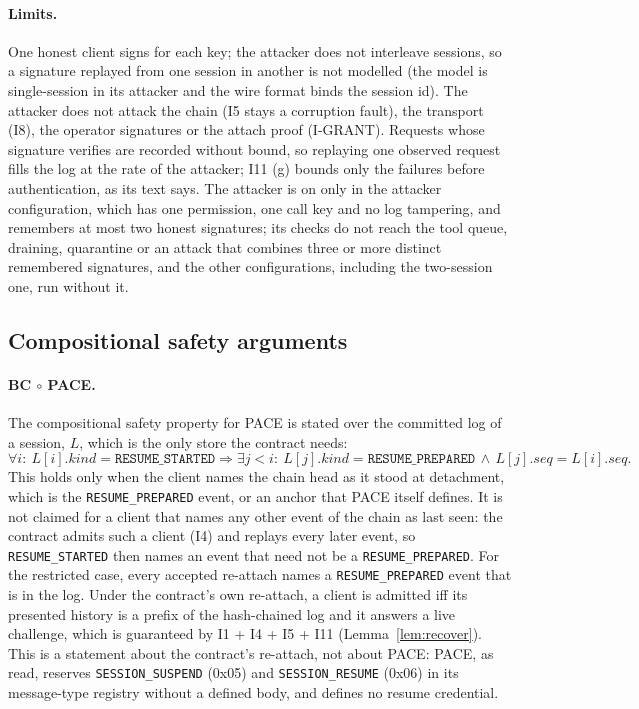 \paragraph{Limits.} One honest client signs for each key; the attacker
does not interleave sessions, so a signature replayed from one session in
another is not modelled (the model is single-session in its attacker and the
wire format binds the session id). The attacker does not attack the chain
(I5 stays a corruption fault), the transport (I8), the operator signatures
or the attach proof (I-GRANT). Requests whose signature verifies are
recorded without bound, so replaying one observed request fills the log at
the rate of the attacker; I11 (g) bounds only the failures before
authentication, as its text says. The attacker is on only in the attacker
configuration, which has one permission, one call key and no log tampering,
and remembers at most two honest signatures; its checks do not reach the
tool queue, draining, quarantine or an attack that combines three or more
distinct remembered signatures, and the other configurations, including the
two-session one, run without it.

\subsection{Compositional safety arguments}
\label{app:comp-safety}

\paragraph{BC $\circ$ PACE.}
The compositional safety property for PACE is stated over the committed
log of a session, $L$, which is the only store the contract needs:
\[
\forall i:\ L[i].\textit{kind} = \texttt{RESUME\_STARTED}
\Rightarrow
\exists j < i:\ L[j].\textit{kind} = \texttt{RESUME\_PREPARED}
\,\wedge\, L[j].\textit{seq} = L[i].\textit{seq}.
\]
This holds only when the client names the chain head as it stood at
detachment, which is the \texttt{RESUME\_PREPARED} event, or an anchor
that PACE itself defines. It is not claimed for a client that names any
other event of the chain as last seen: the contract admits such a client
(I4) and replays every later event, so \texttt{RESUME\_STARTED}
then names an event that need not be a \texttt{RESUME\_PREPARED}. For the
restricted case, every accepted re-attach names a
\texttt{RESUME\_PREPARED} event that is in the log. Under the contract's own re-attach, a
client is admitted iff its presented history is a prefix of the
hash-chained log and it answers a live challenge, which is guaranteed by
I1 + I4 + I5 + I11 (Lemma~\ref{lem:recover}). This is a statement about
the contract's re-attach, not about PACE: PACE, as read, reserves
\texttt{SESSION\_SUSPEND} (0x05) and \texttt{SESSION\_RESUME} (0x06) in
its message-type registry without a defined body, and defines no resume
credential.

